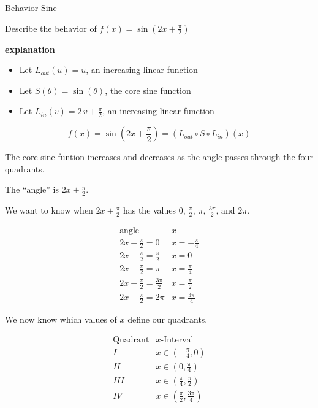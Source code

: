 \documentclass{ximera}
\begin{document}
\begin{example} Behavior Sine

Describe the behavior of   $f(x) = \sin\left( 2 x + \frac{\pi}{2} \right)$



\textbf{\textcolor{red!75!green}{explanation}} 






\begin{itemize}
\item Let $L_{out}(u) = u$, an increasing linear function
\item Let $S(\theta) = \sin(\theta)$, the core sine function
\item Let $L_{in}(v) = 2 \, v + \frac{\pi}{2}$, an increasing linear function
\end{itemize}


\[
f(x) = \sin\left( 2 x + \frac{\pi}{2} \right) = (L_{out} \circ S \circ L_{in})(x)
\]


The core sine funtion increases and decreases as the angle passes through the four quadrants.


The ``angle'' is $2 x + \frac{\pi}{2}$.

We want to know when $2 x + \frac{\pi}{2}$ has the values $0$, $\frac{\pi}{2}$, $\pi$, $\frac{3\pi}{2}$, and $2\pi$.






\[
\begin{array}{l|l}
\text{angle}                  & x  \\ \hline
2 x + \frac{\pi}{2} = 0        & x = -\frac{\pi}{4}  \\
2 x + \frac{\pi}{2} = \frac{\pi}{2}      &  x = 0 \\
2 x + \frac{\pi}{2} = \pi      & x = \frac{\pi}{4}  \\
2 x + \frac{\pi}{2} = \frac{3\pi}{2}     & x = \frac{\pi}{2}   \\
2 x + \frac{\pi}{2} = 2\pi     & x = \frac{3\pi}{4}
\end{array}
\]


We now know which values of $x$ define our quadrants.





\[
\begin{array}{l|l}
\text{Quadrant}                  & x\text{-Interval}  \\  \hline
I        & x \in  \left( -\frac{\pi}{4}, 0 \right)  \\
II       & x \in  \left( 0, \frac{\pi}{4} \right) \\
III      & x \in  \left( \frac{\pi}{4}, \frac{\pi}{2} \right)  \\
IV       & x \in  \left( \frac{\pi}{2}, \frac{3\pi}{4} \right)   \\
\end{array}
\]




\end{example}
\end{document}
